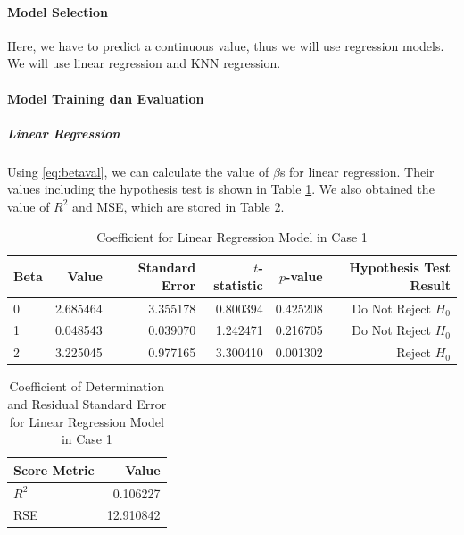 \documentclass[conf]{new-aiaa}
\begin{document}
\paragraph{Model Selection}
Here, we have to predict a continuous value, thus we will use regression models. We will use linear regression and KNN regression.

\paragraph{Model Training dan Evaluation}
\subparagraph{Linear Regression}
Using \ref{eq:betaval}, we can calculate the value of $\beta$s for linear regression. Their values including the hypothesis test is shown in Table \ref{tab:case1_beta_val}. 
We also obtained the value of $R^2$ and MSE, which are stored in Table \ref{tab:case1_r2_rse}.
\begin{table}[H]
    \centering
    \caption{\label{tab:case1_beta_val}Coefficient for Linear Regression Model in Case 1}
    \begin{tabular}{lrrrrr}
        \toprule
        Beta &      Value &  Standard Error &  $t$-statistic &   $p$-value & Hypothesis Test Result \\
        \midrule
        0 &  2.685464 &        3.355178 &     0.800394 &  0.425208 &       Do Not Reject $H_0$ \\
        1 &  0.048543 &        0.039070 &     1.242471 &  0.216705 &       Do Not Reject $H_0$ \\
        2 &  3.225045 &        0.977165 &     3.300410 &  0.001302 &              Reject $H_0$ \\
        \bottomrule
    \end{tabular}
\end{table}
\begin{table}[H]
    \centering
    \caption{\label{tab:case1_r2_rse}Coefficient of Determination and Residual Standard Error for Linear Regression Model in Case 1}
    \begin{tabular}{lr}
        \toprule
        Score Metric &      Value \\
        \midrule
        $R^2$ &      0.106227 \\
        RSE &        12.910842 \\
        \bottomrule
    \end{tabular}
\end{table}
\end{document}
